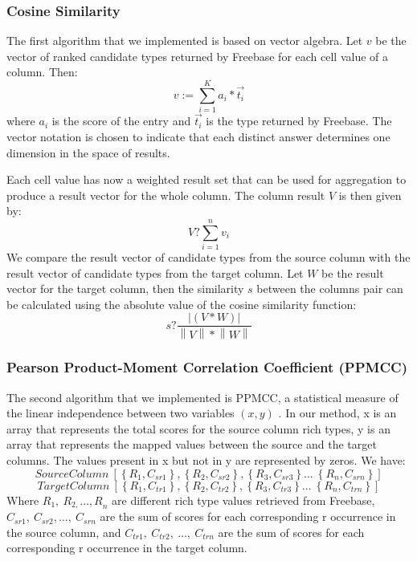 \documentclass{sig-alternate}
\begin{document}
\subsubsection{Cosine Similarity}
The first algorithm that we implemented is based on vector algebra. Let $v$ be the vector of ranked candidate types returned by Freebase for each cell value of a column. Then:
\[v:=\sum^K_{i=1}{a_i}*\overrightarrow{t_i}\]
where $a_i$ is the score of the entry and $\overrightarrow{t_i}$ is the type returned by Freebase. The vector notation is chosen to indicate that each distinct answer determines one dimension in the space of results.

Each cell value has now a weighted result set that can be used for aggregation to produce a result vector for the whole column. The column result $V$ is then given by:
\[V?\sum^n_{i=1}{v_i}\]
We compare the result vector of candidate types from the source column with the result vector of candidate types from the target column. Let $W$ be the result vector for the target column, then the similarity $s$ between the columns pair can be calculated using the absolute value of the cosine similarity function:
\[s?\frac{\left|(V*W)\right|}{\left\|V\right\|*\left\|W\right\|}\]


\subsubsection{Pearson Product-Moment Correlation Coefficient (PPMCC)}

The second algorithm that we implemented is PPMCC, a statistical measure of the linear independence between two variables $\left(x,y\right)$ \cite{citeulike:8051946}. In our method, x is an array that represents the total scores for the source column rich types, y is an array that represents the mapped values between the source and the target columns. The values present in x but not in y are represented by zeros. We have:
\[SourceColumn\ \left[\left\{R_1,C_{sr1}\right\},\left\{R_2,C_{sr2}\right\},\left\{R_3,C_{sr3}\right\}\dots \ \left\{R_n,C_{srn}\right\}\right]\]
\[TargetColumn\ \left[\left\{R_1,C_{tr1}\right\},\left\{R_2,C_{tr2}\right\},\left\{R_3,C_{tr3}\right\}\dots \ \left\{R_n,C_{trn}\right\}\right]\]
Where $R_1,\ R_{2,}{\dots ,R}_n$ are different rich type values retrieved from Freebase, $C_{sr1},\ C_{sr2},\dots ,\ C_{srn}$ are the sum of scores for each corresponding r occurrence in the source column, and $C_{tr1},\ C_{tr2},\ \dots ,\ C_{trn}$ are the sum of scores for each corresponding r occurrence in the target column.
\end{document}
